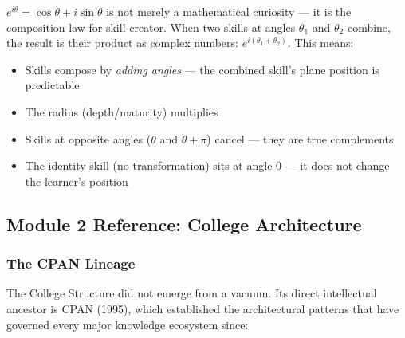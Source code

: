 \documentclass[11pt,letterpaper]{article}
\begin{document}
$e^{i\theta} = \cos\theta + i\sin\theta$ is not merely a mathematical curiosity --- it is the
composition law for skill-creator. When two skills at angles $\theta_1$ and $\theta_2$ combine,
the result is their product as complex numbers: $e^{i(\theta_1 + \theta_2)}$. This means:

\begin{itemize}[noitemsep]
  \item Skills compose by \textit{adding angles} --- the combined skill's plane position is predictable
  \item The radius (depth/maturity) multiplies
  \item Skills at opposite angles ($\theta$ and $\theta + \pi$) cancel --- they are true complements
  \item The identity skill (no transformation) sits at angle $0$ --- it does not change the learner's position
\end{itemize}

\subsection{Module 2 Reference: College Architecture}

\subsubsection{The CPAN Lineage}

The College Structure did not emerge from a vacuum. Its direct intellectual ancestor is CPAN (1995),
which established the architectural patterns that have governed every major knowledge ecosystem since:
\end{document}
